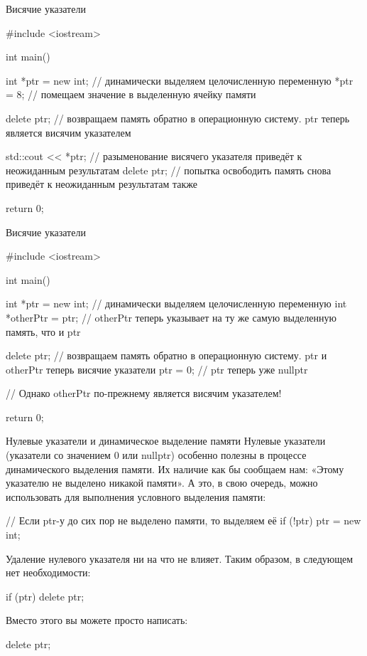 \documentclass[
    9pt,
    hyperref={pdfencoding=unicode}
    ]{beamer}
\theoremstyle{definition}
\begin{document}
\begin{frame}[fragile]{Висячие указатели}
    \begin{cppcode}
        #include <iostream>
        
        int main()
        {
            int *ptr = new int; // динамически выделяем целочисленную переменную
            *ptr = 8; // помещаем значение в выделенную ячейку памяти
            
            delete ptr; // возвращаем память обратно в операционную систему. ptr теперь является висячим указателем
            
            std::cout << *ptr; // разыменование висячего указателя приведёт к неожиданным результатам
            delete ptr; // попытка освободить память снова приведёт к неожиданным результатам также
            
            return 0;
        }
    \end{cppcode}
\end{frame}

\begin{frame}[fragile]{Висячие указатели}
    \begin{cppcode}
        #include <iostream>
        
        int main()
        {
            int *ptr = new int; // динамически выделяем целочисленную переменную 
            int *otherPtr = ptr; // otherPtr теперь указывает на ту же самую выделенную память, что и ptr
            
            delete ptr; // возвращаем память обратно в операционную систему. ptr и otherPtr теперь висячие указатели
            ptr = 0; // ptr теперь уже nullptr
            
            // Однако otherPtr по-прежнему является висячим указателем!
            
            return 0;
        }
    \end{cppcode}
\end{frame}


\begin{frame}[fragile]{Нулевые указатели и динамическое выделение памяти}
    Нулевые указатели (указатели со значением 0 или nullptr) особенно полезны в процессе динамического выделения памяти. Их наличие как бы сообщаем нам: «Этому указателю не выделено никакой памяти». А это, в свою очередь, можно использовать для выполнения условного выделения памяти:
    \begin{cppcode}
        // Если ptr-у до сих пор не выделено памяти, то выделяем её
        if (!ptr)
            ptr = new int;
    \end{cppcode}
    Удаление нулевого указателя ни на что не влияет. Таким образом, в следующем нет необходимости:
    \begin{cppcode}
        if (ptr)
            delete ptr;
    \end{cppcode}
    Вместо этого вы можете просто написать:
    \begin{cppcode}
        delete ptr;
    \end{cppcode}
\end{frame}
\end{document}
